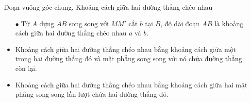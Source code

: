 \begin{dang}{Đoạn vuông góc chung. Khoảng cách giữa hai đường thẳng chéo nhau}
\begin{itemize}
{
		}
		\begin{itemize}
			\item [$\bullet$] Từ $A$ dựng $AB$ song song với $MM'$ cắt $b$ tại $B$, độ dài đoạn $AB$ là khoảng cách giữa hai đường thẳng chéo nhau $a$ và $b$.
		\end{itemize}
	\end{itemize}
	\begin{luuy}
		\begin{itemize}
			\item Khoảng cách giữa hai đường thẳng chéo nhau bằng khoảng cách giữa một trong hai đường thẳng đó và mặt phẳng song song với nó chứa đường thẳng còn lại.
			\item Khoảng cách giữa hai đường thẳng chéo nhau bằng khoảng cách giữa hai mặt phẳng song song lần lượt chứa hai đường thẳng đó.
		\end{itemize}
	\end{luuy}
\end{dang}
